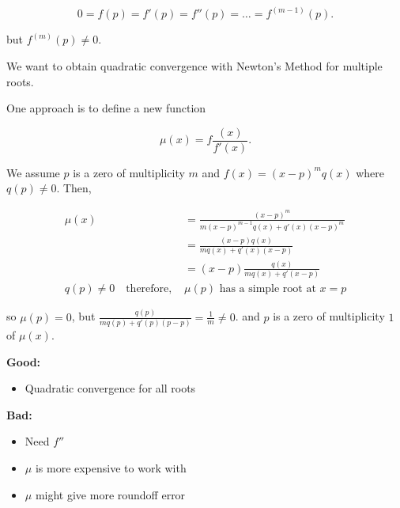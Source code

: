 \[
  0 = f(p) = f'(p) = f''(p) = \dots = f^{(m-1)}(p)
.\]

but $f^{(m)}(p) \neq 0$.

We want to obtain quadratic convergence with Newton's Method for multiple roots.

One approach is to define a new function

\[
  \mu(x) = f\frac{(x)}{f'(x)}
.\]

We assume $p$ is a zero of multiplicity $m$ and $f(x) = (x-p)^m q(x)$ where
$q(p) \neq 0$. Then,

\begin{align*}
  \mu(x) &= \frac{(x-p)^m}{m(x-p)^{m-1} q(x) + q'(x)(x-p)^m} \\
  &= \frac{(x-p)q(x)}{mq(x) + q'(x) (x-p)}  \\
  &= (x-p) \frac{q(x)}{mq(x)+q'(x-p)} \\
  q(p) \neq 0 \quad\text{therefore, } &\mu(p) \text{ has a simple root at } x=p
\end{align*}

so $\mu(p) = 0$, but $\displaystyle \frac{q(p)}{mq(p) + q'(p)(p-p)} = \frac{1}{m} \neq 0$.
and $p$ is a zero of multiplicity $1$ of $\mu(x)$.

\textbf{Good:}
\begin{itemize}
  \item Quadratic convergence for all roots
\end{itemize}

\textbf{Bad:}
\begin{itemize}
  \item Need $f''$
  \item $\mu$ is more expensive to work with
  \item $\mu$ might give more roundoff error
\end{itemize}

